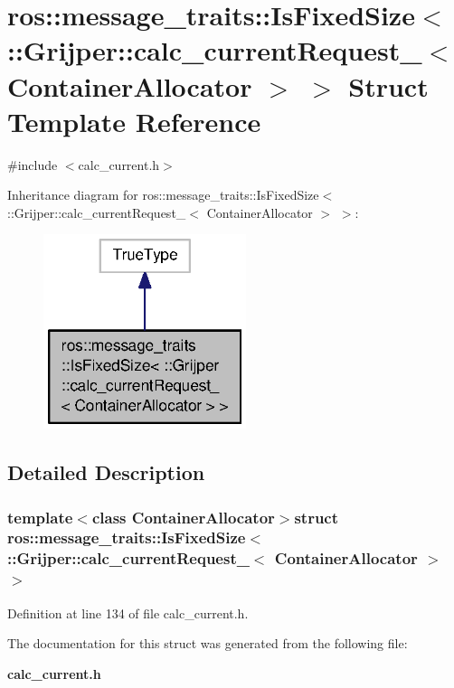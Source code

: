 \section{ros\-:\-:message\-\_\-traits\-:\-:Is\-Fixed\-Size$<$ \-:\-:Grijper\-:\-:calc\-\_\-current\-Request\-\_\-$<$ Container\-Allocator $>$ $>$ Struct Template Reference}
\label{structros_1_1message__traits_1_1IsFixedSize_3_01_1_1Grijper_1_1calc__currentRequest___3_01ContainerAllocator_01_4_01_4}


{\ttfamily \#include $<$calc\-\_\-current.\-h$>$}



Inheritance diagram for ros\-:\-:message\-\_\-traits\-:\-:Is\-Fixed\-Size$<$ \-:\-:Grijper\-:\-:calc\-\_\-current\-Request\-\_\-$<$ Container\-Allocator $>$ $>$\-:\nopagebreak
\begin{figure}[H]
\begin{center}
\leavevmode
\includegraphics[width=168pt]{structros_1_1message__traits_1_1IsFixedSize_3_01_1_1Grijper_1_1calc__currentRequest___3_01Contaiebed624e05eab9a86efd64fb905c285f}
\end{center}
\end{figure}


\subsection{Detailed Description}
\subsubsection*{template$<$class Container\-Allocator$>$struct ros\-::message\-\_\-traits\-::\-Is\-Fixed\-Size$<$ \-::\-Grijper\-::calc\-\_\-current\-Request\-\_\-$<$ Container\-Allocator $>$ $>$}



Definition at line 134 of file calc\-\_\-current.\-h.



The documentation for this struct was generated from the following file\-:\begin{DoxyCompactItemize}
\item 
{\bf calc\-\_\-current.\-h}\end{DoxyCompactItemize}
